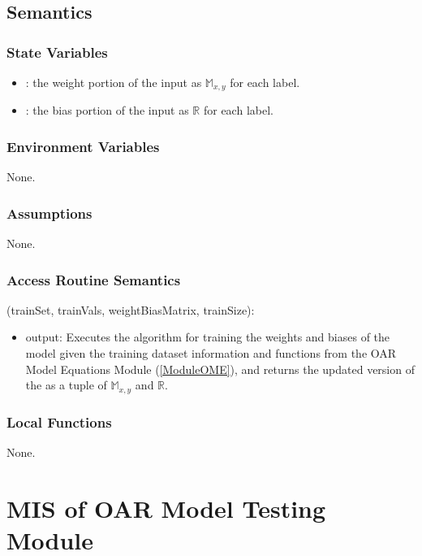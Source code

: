 \documentclass[12pt, titlepage]{article}
\begin{document}
\subsection{Semantics}

\subsubsection{State Variables}

\begin{itemize}
\item {}: the weight portion of the  input as $\mathbb{M}_{x, y}$ for each label.
\item {}: the bias portion of the  input as $\mathbb{R}$ for each label.
\end{itemize}

\subsubsection{Environment Variables}

None.

\subsubsection{Assumptions}

None.

\subsubsection{Access Routine Semantics}

\noindent {}(trainSet, trainVals, weightBiasMatrix, trainSize):
\begin{itemize}
\item output: Executes the algorithm for training the weights and biases of the model given the
training dataset information and functions from the OAR Model Equations Module (\ref{ModuleOME}), and
returns the updated version of the  as a tuple of $\mathbb{M}_{x, y}$ and $\mathbb{R}$.
\end{itemize}

\subsubsection{Local Functions}

None.

\section{MIS of OAR Model Testing Module} \label{ModuleOMTs} 
\end{document}

